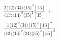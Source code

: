 \documentclass[varwidth, border=5pt]{standalone}
\begin{document}
\begin{my}
$\begin{gathered}
\scriptscriptstyle\frac{2⟨12⟩⟨34⟩⟨15⟩^3[13]}{⟨13⟩⟨14⟩^3⟨35⟩^2[35]}+\\
\scriptscriptstyle\frac{1⟨12⟩^2⟨34⟩⟨15⟩^2[13]^2}{⟨13⟩⟨14⟩^2⟨24⟩⟨35⟩^2[35]^2}\phantom{+}
\end{gathered}$
\end{my}
\end{document}
